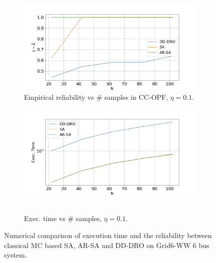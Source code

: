 \begin{figure}[hbt]
    \centering
    \begin{subfigure}{.9\textwidth}
      \centering
      \hspace{0mm}\includegraphics[width=0.99\linewidth]{Dissertation/images/dynamic/grid6/dd-dro/1_beta_N_102_eta_0.1.png}
      \hspace{0mm}\caption{Empirical reliability %
      vs $\#$ samples in CC-OPF, $\eta = 0.1$.}
      \label{fig:grid6reliability-dd-dro}
    \end{subfigure}
    
    \begin{subfigure}{.9\textwidth}
      \centering \hspace{10mm}\includegraphics[width=0.99\linewidth]{Dissertation/images/dynamic/grid6/dd-dro/exec_time_N_102_eta_0.1.png}~~~~~~\hfill
      \caption{Exec. time vs $\#$ samples, $\eta = 0.1$.
      }
      \label{fig:grid6time-dd-dro}
    \end{subfigure}
    \caption{Numerical comparison of execution time and the reliability between classical MC based SA, AR-SA and DD-DRO on Grid6-WW 6 bus system.  
    }
\label{fig:ar-sa-vs-dd-dro}
\end{figure}


